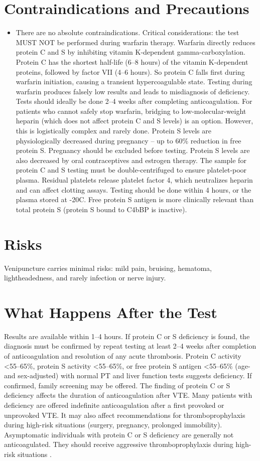 \section*{Contraindications and Precautions}
\begin{itemize}
  \item There are no absolute contraindications. Critical considerations: the test MUST NOT be performed during warfarin therapy. Warfarin directly reduces protein C and S by inhibiting vitamin K-dependent gamma-carboxylation. Protein C has the shortest half-life (6--8 hours) of the vitamin K-dependent proteins, followed by factor VII (4--6 hours). So protein C falls first during warfarin initiation, causing a transient hypercoagulable state. Testing during warfarin produces falsely low results and leads to misdiagnosis of deficiency. Tests should ideally be done 2--4 weeks after completing anticoagulation. For patients who cannot safely stop warfarin, bridging to low-molecular-weight heparin (which does not affect protein C and S levels) is an option. However, this is logistically complex and rarely done. Protein S levels are physiologically decreased during pregnancy -- up to 60\% reduction in free protein S. Pregnancy should be excluded before testing. Protein S levels are also decreased by oral contraceptives and estrogen therapy. The sample for protein C and S testing must be double-centrifuged to ensure platelet-poor plasma. Residual platelets release platelet factor 4, which neutralizes heparin and can affect clotting assays. Testing should be done within 4 hours, or the plasma stored at -20\textdegree{}C. Free protein S antigen is more clinically relevant than total protein S (protein S bound to C4bBP is inactive).
\end{itemize}
\section*{Risks}
Venipuncture carries minimal risks: mild pain, bruising, hematoma, lightheadedness, and rarely infection or nerve injury.

\section*{What Happens After the Test}
Results are available within 1--4 hours. If protein C or S deficiency is found, the diagnosis must be confirmed by repeat testing at least 2--4 weeks after completion of anticoagulation and resolution of any acute thrombosis. Protein C activity <55--65\%, protein S activity <55--65\%, or free protein S antigen <55--65\% (age- and sex-adjusted) with normal PT and liver function tests suggests deficiency. If confirmed, family screening may be offered. The finding of protein C or S deficiency affects the duration of anticoagulation after VTE. Many patients with deficiency are offered indefinite anticoagulation after a first provoked or unprovoked VTE. It may also affect recommendations for thromboprophylaxis during high-risk situations (surgery, pregnancy, prolonged immobility). Asymptomatic individuals with protein C or S deficiency are generally not anticoagulated. They should receive aggressive thromboprophylaxis during high-risk situations \cite{comp2021protein}.

